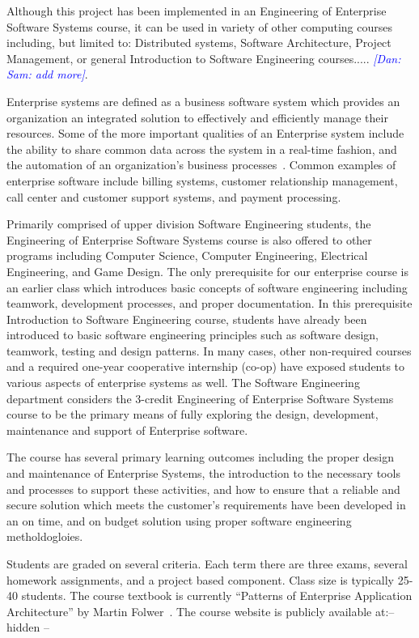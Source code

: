 \documentclass{sig-alternate-05-2015}
\newcommand{\dan}[1]{\textcolor{blue}{{\it [Dan: #1]}}}
\newif\ifisnopii
\begin{document}
Although this project has been implemented in an Engineering of Enterprise Software Systems course, it can be used in variety of other computing courses including, but limited to: Distributed systems, Software Architecture, Project Management, or general Introduction to Software Engineering courses..... \dan{Sam: add more}.

Enterprise systems are defined as a business software system which provides an organization an integrated solution to effectively and efficiently manage their resources. Some of the more important qualities of an Enterprise system include the ability to share common data across the system in a real-time fashion, and the automation of an organization's business processes~\cite{fui2001critical}. Common examples of enterprise software include billing systems, customer relationship management, call center and customer support systems, and payment processing. 

Primarily comprised of upper division Software Engineering students, the Engineering of Enterprise Software Systems course is also offered to other programs including Computer Science, Computer Engineering, Electrical Engineering, and Game Design. The only prerequisite for our enterprise course is an earlier class which introduces basic concepts of software engineering including teamwork, development processes, and proper documentation. In this prerequisite Introduction to Software Engineering course, students have already been introduced to basic software engineering principles such as software design, teamwork, testing and design patterns. In many cases, other non-required courses and a required one-year cooperative internship (co-op) have exposed students to various aspects of enterprise systems as well. The Software Engineering department considers the 3-credit Engineering of Enterprise Software Systems course to be the primary means of fully exploring the design, development, maintenance and support of Enterprise software. 

The course has several primary learning outcomes including the proper design and maintenance of Enterprise Systems, the introduction to the necessary tools and processes to support these activities, and how to ensure that a reliable and secure solution which meets the customer's requirements have been developed in an on time, and on budget solution using proper software engineering metholdogloies.


Students are graded on several criteria. Each term there are three exams, several homework assignments, and a project based component. Class size is typically 25-40 students. The course textbook is currently ``Patterns of Enterprise Application Architecture'' by Martin Folwer~\cite{Fowler:2002:PEA:579257}. The course website is publicly available at:\ifisnopii ~\textbf{\url{http://www.se.rit.edu/~swen-343/}}\else --hidden --\fi
\end{document}
